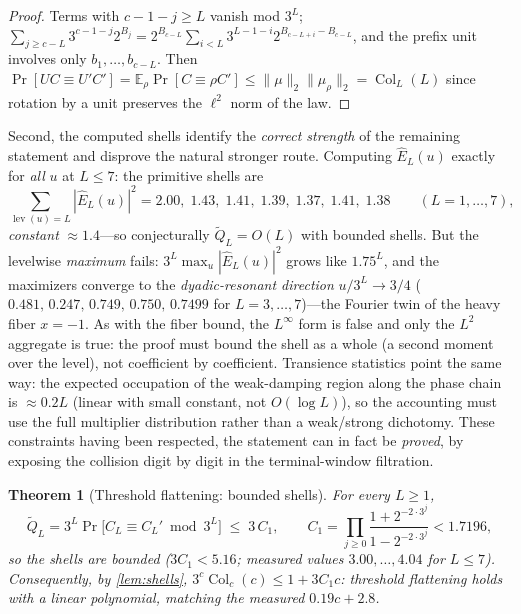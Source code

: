 \documentclass[11pt]{article}
\newcommand{\E}{\mathbb{E}}
\theoremstyle{plain}
\newtheorem{theorem}{Theorem}
\theoremstyle{definition}
\theoremstyle{remark}
\begin{document}
\begin{proof}
Terms with $c-1-j\ge L$ vanish mod $3^L$;
$\sum_{j\ge c-L}3^{c-1-j}2^{B_j}=2^{B_{c-L}}\sum_{i<L}3^{L-1-i}
2^{B_{c-L+i}-B_{c-L}}$, and the prefix unit involves only $b_1,\dots,
b_{c-L}$. Then
$\Pr[UC\equiv U'C']=\E_\rho\Pr[C\equiv\rho C']\le
\lVert\mu\rVert_2\lVert\mu_\rho\rVert_2=\operatorname{Col}_L(L)$ since
rotation by a unit preserves the $\ell^2$ norm of the law.
\end{proof}

Second, the computed shells identify the \emph{correct strength} of the
remaining statement and disprove the natural stronger route. Computing
$\hat E_L(u)$ exactly for \emph{all} $u$ at $L\le7$: the primitive shells
are
\[
\sum_{\operatorname{lev}(u)=L}|\hat E_L(u)|^2
=2.00,\;1.43,\;1.41,\;1.39,\;1.37,\;1.41,\;1.38
\qquad(L=1,\dots,7),
\]
\emph{constant} $\approx1.4$---so conjecturally $\tilde Q_L=O(L)$ with
bounded shells. But the levelwise \emph{maximum} fails:
$3^L\max_u|\hat E_L(u)|^2$ grows like $1.75^L$, and the maximizers
converge to the \emph{dyadic-resonant direction} $u/3^L\to3/4$
($0.481,\,0.247,\,0.749,\,0.750,\,0.7499$ for $L=3,\dots,7$)---the
Fourier twin of the heavy fiber $x=-1$. As with the fiber bound, the
$L^\infty$ form is false and only the $L^2$ aggregate is true: the proof
must bound the shell as a whole (a second moment over the level), not
coefficient by coefficient. Transience statistics point the same way: the
expected occupation of the weak-damping region along the phase chain is
$\approx0.2L$ (linear with small constant, not $O(\log L)$), so the
accounting must use the full multiplier distribution rather than a
weak/strong dichotomy. These constraints having been respected, the
statement can in fact be \emph{proved}, by exposing the collision digit by
digit in the terminal-window filtration.

\begin{theorem}[Threshold flattening: bounded shells]\label{op:flat}
For every $L\ge1$,
\[
\tilde Q_L=3^L\Pr\bigl[C_L\equiv C_L'\bmod3^L\bigr]
\;\le\;3\,C_1,
\qquad
C_1=\prod_{j\ge0}\frac{1+2^{-2\cdot3^j}}{1-2^{-2\cdot3^j}}<1.7196 ,
\]
so the shells are \emph{bounded} ($3C_1<5.16$; measured values
$3.00,\dots,4.04$ for $L\le7$). Consequently, by \cref{lem:shells},
$3^c\operatorname{Col}_c(c)\le1+3C_1c$: threshold flattening holds with a
\emph{linear} polynomial, matching the measured $0.19c+2.8$.
\end{theorem}
\end{document}
